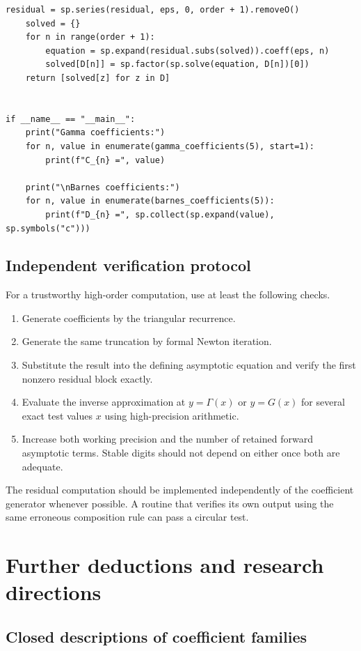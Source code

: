 \documentclass[11pt]{article}
\theoremstyle{definition}
\theoremstyle{remark}
\begin{document}
\begin{lstlisting}[style=pythonstyle,caption={Exact symbolic generation of the inverse coefficients.}]
    residual = sp.series(residual, eps, 0, order + 1).removeO()
    solved = {}
    for n in range(order + 1):
        equation = sp.expand(residual.subs(solved)).coeff(eps, n)
        solved[D[n]] = sp.factor(sp.solve(equation, D[n])[0])
    return [solved[z] for z in D]


if __name__ == "__main__":
    print("Gamma coefficients:")
    for n, value in enumerate(gamma_coefficients(5), start=1):
        print(f"C_{n} =", value)

    print("\nBarnes coefficients:")
    for n, value in enumerate(barnes_coefficients(5)):
        print(f"D_{n} =", sp.collect(sp.expand(value), sp.symbols("c")))
\end{lstlisting}

\subsection{Independent verification protocol}

For a trustworthy high-order computation, use at least the following checks.

\begin{enumerate}
\item Generate coefficients by the triangular recurrence.
\item Generate the same truncation by formal Newton iteration.
\item Substitute the result into the defining asymptotic equation and verify the first nonzero residual block exactly.
\item Evaluate the inverse approximation at \(y=\Gamma(x)\) or \(y=G(x)\) for several exact test values \(x\) using high-precision arithmetic.
\item Increase both working precision and the number of retained forward asymptotic terms.  Stable digits should not depend on either once both are adequate.
\end{enumerate}

The residual computation should be implemented independently of the coefficient generator whenever possible.  A routine that verifies its own output using the same erroneous composition rule can pass a circular test.

\section{Further deductions and research directions}\label{sec:research}

\subsection{Closed descriptions of coefficient families}
\end{document}
